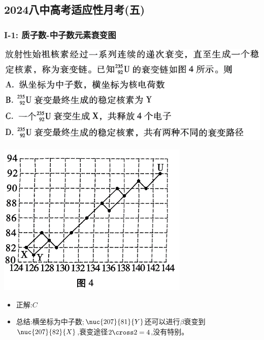 \documentclass{article}
\begin{document}
\vspace{2em}

\subsection{2024八中高考适应性月考(五)}
\subsubsection{I-1: 质子数-中子数元素衰变图}
\begin{minipage}{0.6\textwidth}
    \includegraphics[width=\textwidth,keepaspectratio]{./pictures/3.5-1.png}
\end{minipage}
\hfill
\begin{minipage}{0.35\textwidth}
    \includegraphics[width=\textwidth,keepaspectratio]{./pictures/3.5-2.png}
\end{minipage}

\begin{itemize}
    \item 正解:\quad $C$
    \item 总结:\quad 横坐标为中子数;$\nuc{207}{81}{Y}$还可以进行$\beta$衰变到$\nuc{207}{82}{X}$,衰变途径$2 \cross 2 = 4$,没有特别。
\end{itemize}
\end{document}
